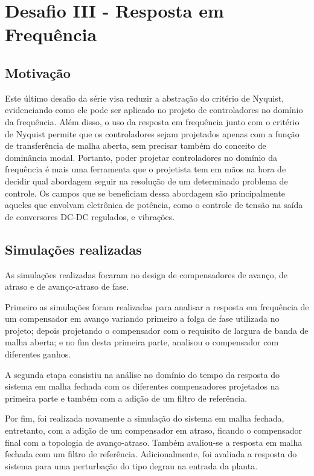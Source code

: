 \section{Desafio III - Resposta em Frequência} 

\subsection{Motivação}
Este último desafio da série visa reduzir a abstração do critério de Nyquist,
evidenciando como ele pode ser aplicado no projeto de controladores no domínio
da frequência. Além disso, o uso da resposta em frequência junto com o critério
de Nyquist permite que os controladores sejam projetados apenas com a função de
transferência de malha aberta, sem precisar também do conceito de dominância
modal. Portanto, poder projetar controladores no domínio da frequência é mais
uma ferramenta que o projetista tem em mãos na hora de decidir qual abordagem
seguir na resolução de um determinado problema de controle. Os campos que se
beneficiam dessa abordagem são principalmente aqueles que envolvam eletrônica de
potência, como o controle de tensão na saída de conversores DC-DC regulados, e
vibrações. 

\subsection{Simulações realizadas}
As simulações realizadas focaram no design de compensadores de avanço, de atraso
e de avanço-atraso de fase.

Primeiro as simulações foram realizadas para analisar a
resposta em frequência de um compensador em avanço variando primeiro a folga de
fase utilizada no projeto; depois projetando o compensador com o requisito de
largura de banda de malha aberta; e no fim desta primeira parte, analisou o
compensador com diferentes ganhos.

A segunda etapa consistiu na análise no
domínio do tempo da resposta do sistema em malha fechada com os diferentes
compensadores projetados na primeira parte e também com a adição de um filtro de
referência.

Por fim, foi realizada novamente a simulação do sistema em malha fechada,
entretanto, com a adição de um compensador em atraso, ficando o compensador
final com a topologia de avanço-atraso. Também avaliou-se a resposta em malha
fechada com um filtro de referência. Adicionalmente, foi avaliada a resposta do
sistema para uma perturbação do tipo degrau na entrada da planta.

